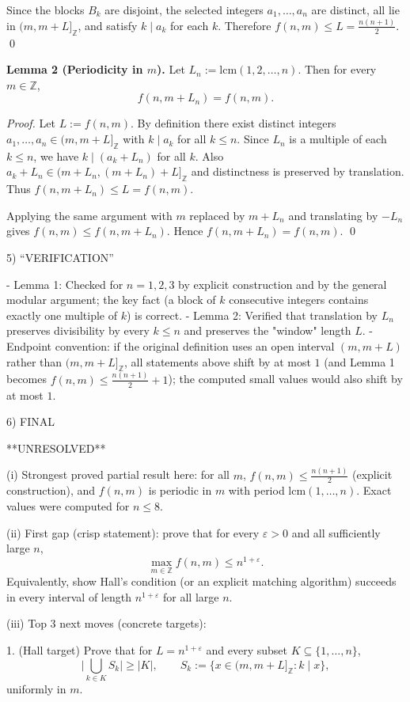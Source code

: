 Since the blocks $B_k$ are disjoint, the selected integers $a_1,\dots,a_n$ are distinct, all lie in $(m,m+L]_{\mathbb Z}$, and satisfy $k\mid a_k$ for each $k$. Therefore $f(n,m)\le L=\frac{n(n+1)}2$.
\qed

\medskip
\textbf{Lemma 2 (Periodicity in $m$).}
Let $L_n:=\mathrm{lcm}(1,2,\dots,n)$. Then for every $m\in\mathbb Z$,
\[
 f(n,m+L_n)=f(n,m).
\]

\emph{Proof.}
Let $L:=f(n,m)$. By definition there exist distinct integers $a_1,\dots,a_n\in(m,m+L]_{\mathbb Z}$ with $k\mid a_k$ for all $k\le n$.
Since $L_n$ is a multiple of each $k\le n$, we have $k\mid (a_k+L_n)$ for all $k$.
Also $a_k+L_n\in(m+L_n,(m+L_n)+L]_{\mathbb Z}$ and distinctness is preserved by translation.
Thus $f(n,m+L_n)\le L=f(n,m)$.

Applying the same argument with $m$ replaced by $m+L_n$ and translating by $-L_n$ gives $f(n,m)\le f(n,m+L_n)$.
Hence $f(n,m+L_n)=f(n,m)$.
\qed

5) “VERIFICATION”

- Lemma 1: Checked for $n=1,2,3$ by explicit construction and by the general modular argument; the key fact (a block of $k$ consecutive integers contains exactly one multiple of $k$) is correct.
- Lemma 2: Verified that translation by $L_n$ preserves divisibility by every $k\le n$ and preserves the "window" length $L$.
- Endpoint convention: if the original definition uses an open interval $(m,m+L)$ rather than $(m,m+L]_{\mathbb Z}$, all statements above shift by at most $1$ (and Lemma 1 becomes $f(n,m)\le \frac{n(n+1)}2+1$); the computed small values would also shift by at most $1$.

6) FINAL

**UNRESOLVED**

(i) Strongest proved partial result here: for all $m$, $f(n,m)\le \frac{n(n+1)}2$ (explicit construction), and $f(n,m)$ is periodic in $m$ with period $\mathrm{lcm}(1,\dots,n)$. Exact values were computed for $n\le 8$.

(ii) First gap (crisp statement): prove that for every $\varepsilon>0$ and all sufficiently large $n$,
\[
\max_{m\in\mathbb Z} f(n,m) \le n^{1+\varepsilon}.
\]
Equivalently, show Hall's condition (or an explicit matching algorithm) succeeds in every interval of length $n^{1+\varepsilon}$ for all large $n$.

(iii) Top 3 next moves (concrete targets):

1. (Hall target) Prove that for $L=n^{1+\varepsilon}$ and every subset $K\subseteq\{1,\dots,n\}$,
\[\bigl|\bigcup_{k\in K} S_k\bigr|\ge |K|,\qquad S_k:=\{x\in(m,m+L]_{\mathbb Z}:k\mid x\},\]
uniformly in $m$.

